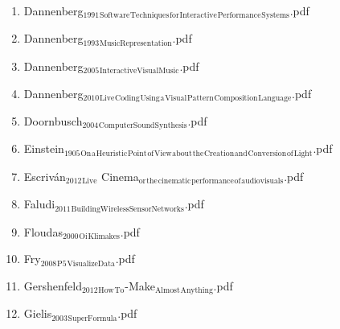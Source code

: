 \documentclass[11pt]{article}
\begin{document}
\begin{enumerate}
\begin{enumerate}
\begin{enumerate}
\begin{enumerate}
\begin{enumerate}
\item Dannenberg$_{\text{1991}}$$_{\text{Software}}$$_{\text{Techniques}}$$_{\text{for}}$$_{\text{Interactive}}$$_{\text{Performance}}$$_{\text{Systems}}$.pdf
\label{sec-1-1-1-1-7-1-1-25}

\item Dannenberg$_{\text{1993}}$$_{\text{MusicRepresentation}}$.pdf
\label{sec-1-1-1-1-7-1-1-26}

\item Dannenberg$_{\text{2005}}$$_{\text{InteractiveVisualMusic}}$.pdf
\label{sec-1-1-1-1-7-1-1-27}

\item Dannenberg$_{\text{2010}}$$_{\text{Live}}$$_{\text{Coding}}$$_{\text{Using}}$$_{\text{a}}$$_{\text{Visual}}$$_{\text{Pattern}}$$_{\text{Composition}}$$_{\text{Language}}$.pdf
\label{sec-1-1-1-1-7-1-1-28}

\item Doornbusch$_{\text{2004}}$$_{\text{ComputerSoundSynthesis}}$.pdf
\label{sec-1-1-1-1-7-1-1-29}

\item Einstein$_{\text{1905}}$$_{\text{On}}$$_{\text{a}}$$_{\text{Heuristic}}$$_{\text{Point}}$$_{\text{of}}$$_{\text{View}}$$_{\text{about}}$$_{\text{the}}$$_{\text{Creation}}$$_{\text{and}}$$_{\text{Conversion}}$$_{\text{of}}$$_{\text{Light}}$.pdf
\label{sec-1-1-1-1-7-1-1-30}

\item Escriván$_{\text{2012}}$$_{\text{Live}}$ Cinema$_{\text{or}}$$_{\text{the}}$$_{\text{cinematic}}$$_{\text{performance}}$$_{\text{of}}$$_{\text{audiovisuals}}$.pdf
\label{sec-1-1-1-1-7-1-1-31}

\item Faludi$_{\text{2011}}$$_{\text{BuildingWirelessSensorNetworks}}$.pdf
\label{sec-1-1-1-1-7-1-1-32}

\item Floudas$_{\text{2000}}$$_{\text{Oi}}$$_{\text{Klimakes}}$.pdf
\label{sec-1-1-1-1-7-1-1-33}

\item Fry$_{\text{2008}}$$_{\text{P5}}$$_{\text{VisualizeData}}$.pdf
\label{sec-1-1-1-1-7-1-1-34}

\item Gershenfeld$_{\text{2012}}$$_{\text{How}}$$_{\text{To}}$-Make$_{\text{Almost}}$$_{\text{Anything}}$.pdf
\label{sec-1-1-1-1-7-1-1-35}

\item Gielis$_{\text{2003}}$$_{\text{SuperFormula}}$.pdf
\label{sec-1-1-1-1-7-1-1-36}


\end{enumerate}
\end{enumerate}
\end{enumerate}
\end{enumerate}
\end{enumerate}
\end{document}
